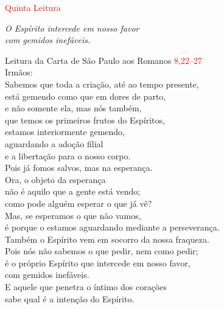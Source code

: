 \documentclass{book}
\begin{document}
\begin{center}

    \textcolor{red}{Quinta Leitura}

\end{center}

\begin{flushright}
    \textit{O Espírito intercede em nosso favor \\ com gemidos inefáveis.}
\end{flushright}

\begin{flushleft}

    \vspace{0.2cm}
    Leitura da Carta de São Paulo aos Romanos
    \hspace{\fill}
    \textcolor{red}{8,22--27}
    \vspace{0.2cm} \\
    Irmãos: \\
    Sabemos que toda a criação, até ao tempo presente, \\
    está gemendo como que em dores de parto, \\
    e não somente ela, mas nós também, \\
    que temos os primeiros frutos do Espíritos, \\
    estamos interiormente gemendo, \\
    aguardando a adoção filial \\
    e a libertação para o nosso corpo. \\
    Pois já fomos salvos, mas na esperança. \\
    Ora, o objeto da esperança \\
    não é aquilo que a gente está vendo; \\
    como pode alguém esperar o que já vê? \\
    Mas, se esperamos o que não vamos, \\
    é porque o estamos aguardando mediante a perseverança. \\
    Também o Espírito vem em socorro da nossa fraqueza. \\
    Pois nós não sabemos o que pedir, nem como pedir; \\
    é o próprio Espírito que intercede em nosso favor, \\
    com gemidos inefáveis. \\
    E aquele que penetra o íntimo dos corações \\
    sabe qual é a intenção do Espírito. \\

\end{flushleft}
\end{document}
